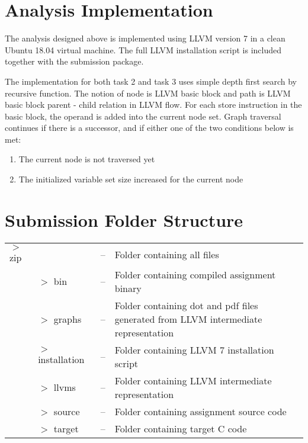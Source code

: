\documentclass[11pt,a4paper,fleqn]{article}
\begin{document}
   \section{Analysis Implementation}

   The analysis designed above is implemented using LLVM version 7 in a clean Ubuntu 18.04 virtual machine. 
   The full LLVM installation script is included together with the submission package.
   
   The implementation for both task 2 and task 3 uses simple depth first search by recursive function. 
   The notion of node is LLVM basic block and path is LLVM basic block parent - child relation in LLVM flow. 
   For each store instruction in the basic block, the operand is added into the current node set. 
   Graph traversal continues if there is a successor, and if either one of the two conditions below is met:

   \begin{enumerate}
      \item The current node is not traversed yet
      \item The initialized variable set size increased for the current node
   \end{enumerate}

   \section{Submission Folder Structure}

   \begin{tabularx}{\linewidth}{l l l X}
      $>$ zip  &                    & -- & Folder containing all files                   \\
               & $>$ bin            & -- & Folder containing compiled assignment binary  \\
               & $>$ graphs         & -- & Folder containing dot and pdf files generated from LLVM intermediate representation  \\
               & $>$ installation   & -- & Folder containing LLVM 7 installation script \\
               & $>$ llvms          & -- & Folder containing LLVM intermediate representation  \\
               & $>$ source         & -- & Folder containing assignment source code  \\
               & $>$ target         & -- & Folder containing target C code  \\
   \end{tabularx}
\end{document}
